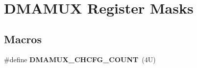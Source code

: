 \hypertarget{group___d_m_a_m_u_x___register___masks}{}\section{D\+M\+A\+M\+UX Register Masks}
\label{group___d_m_a_m_u_x___register___masks}
\subsection*{Macros}
\begin{DoxyCompactItemize}
\item 
\mbox{\label{group___d_m_a_m_u_x___register___masks_ga142bd4d929a1397622dd8a716558f3bb}} 
\#define {\bfseries D\+M\+A\+M\+U\+X\+\_\+\+C\+H\+C\+F\+G\+\_\+\+C\+O\+U\+NT}~(4\+U)
\end{DoxyCompactItemize}
